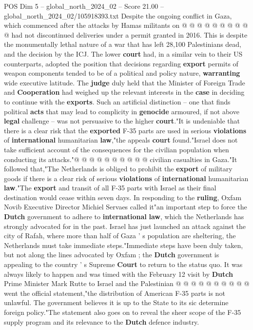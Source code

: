 \begin{textsample}{POS Dim 5 – global\_north\_2024\_02 – Score 21.00 – global\_north\_2024\_02/105918393.txt}
Despite the ongoing conflict in Gaza, which commenced after the attacks by Hamas militants on @ @ @ @ @ @ @ @ @ @ had not discontinued deliveries under a permit granted in 2016.
This is despite the monumentally lethal nature of a war that has left 28,100 Palestinians dead, and the decision by the ICJ.
The lower \textbf{court} had, in a similar vein to their US counterparts, adopted the position that decisions regarding \textbf{export} permits of weapon components tended to be of a political and policy nature, \textbf{warranting} wide executive latitude.
The \textbf{judge} duly held that the Minister of Foreign Trade and \textbf{Cooperation} had weighed up the relevant interests in the \textbf{case} in deciding to continue with the \textbf{exports}.
Such an artificial distinction -- one that finds political \textbf{acts} that may lead to complicity in \textbf{genocide} armoured, if not above \textbf{legal} challenge -- was not persuasive to the higher \textbf{court}."It is undeniable that there is a clear risk that the \textbf{exported} F-35 parts are used in serious \textbf{violations} of \textbf{international} humanitarian \textbf{law},"the appeals \textbf{court} found."Israel does not take sufficient account of the consequences for the civilian population when conducting its attacks."@ @ @ @ @ @ @ @ @ @ civilian casualties in Gaza."It followed that,"The Netherlands is obliged to prohibit the \textbf{export} of military goods if there is a clear risk of serious \textbf{violations} of \textbf{international} humanitarian \textbf{law}."The \textbf{export} and transit of all F-35 parts with Israel as their final destination would cease within seven days.
In responding to the \textbf{ruling}, Oxfam Novib Executive Director Michiel Servaes called it"an important step to force the \textbf{Dutch} government to adhere to \textbf{international} \textbf{law}, which the Netherlands has strongly advocated for in the past.
Israel has just launched an attack against the city of Rafah, where more than half of Gaza ' s population are sheltering, the Netherlands must take immediate steps."Immediate steps have been duly taken, but not along the lines advocated by Oxfam ; the \textbf{Dutch} government is appealing to the country ' s Supreme \textbf{Court} to return to the status quo.
It was always likely to happen and was timed with the February 12 visit by \textbf{Dutch} Prime Minister Mark Rutte to Israel and the Palestinian @ @ @ @ @ @ @ @ @ @ went the official statement,"the distribution of American F-35 parts is not unlawful.
The government believes it is up to the State to its sic determine foreign policy."The statement also goes on to reveal the sheer scope of the F-35 supply program and its relevance to the \textbf{Dutch} defence industry.

\end{textsample}
